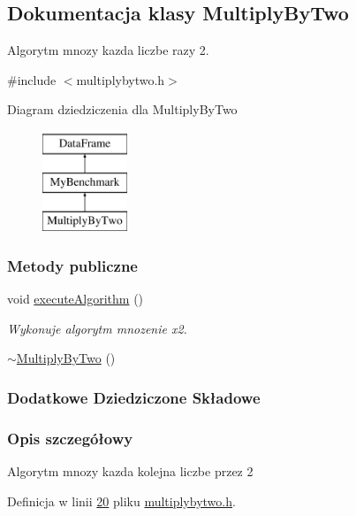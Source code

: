 \hypertarget{class_multiply_by_two}{\subsection{Dokumentacja klasy Multiply\-By\-Two}
\label{class_multiply_by_two}
}


Algorytm mnozy kazda liczbe razy 2.  




{\ttfamily \#include $<$multiplybytwo.\-h$>$}

Diagram dziedziczenia dla Multiply\-By\-Two\begin{figure}[H]
\begin{center}
\leavevmode
\includegraphics[height=3.000000cm]{class_multiply_by_two}
\end{center}
\end{figure}
\subsubsection*{Metody publiczne}
\begin{DoxyCompactItemize}
\item 
void \hyperlink{class_multiply_by_two_aad2080a1fdab088814170e529a14db1e}{execute\-Algorithm} ()
\begin{DoxyCompactList}\small\item\em Wykonuje algorytm mnozenie x2. \end{DoxyCompactList}\item 
\hyperlink{class_multiply_by_two_ab84d2c946e0ac7d6eeef32d5800ce4a5}{$\sim$\-Multiply\-By\-Two} ()
\end{DoxyCompactItemize}
\subsubsection*{Dodatkowe Dziedziczone Składowe}


\subsubsection{Opis szczegółowy}
Algorytm mnozy kazda kolejna liczbe przez 2 

Definicja w linii \hyperlink{multiplybytwo_8h_source_l00020}{20} pliku \hyperlink{multiplybytwo_8h_source}{multiplybytwo.\-h}.



